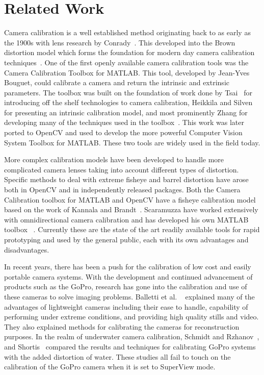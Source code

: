 \section{Related Work}\label{sec:camrel}
Camera calibration is a well established method originating back to as early as the 1900s with lens research by Conrady~\cite{Conrady1919}. This developed into the Brown distortion model which forms the foundation for modern day camera calibration techniques~\cite{Brown1966,Brown1971,Brown1986}. One of the first openly available camera calibration tools was the Camera Calibration Toolbox for MATLAB. This tool, developed by Jean-Yves Bouguet, could calibrate a camera and return the intrinsic and extrinsic parameters. The toolbox was built on the foundation of work done by Tsai~\cite{Tsai1987} for introducing off the shelf technologies to camera calibration, Heikkila and Silven~\cite{Silven1997} for presenting an intrinsic calibration model, and most prominently Zhang for developing many of the techniques used in the toolbox~\cite{Zhang2000}. This work was later ported to OpenCV and used to develop the more powerful Computer Vision System Toolbox for MATLAB. These two tools are widely used in the field today. 

More complex calibration models have been developed to handle more complicated camera lenses taking into account different types of distortion. Specific methods to deal with extreme fisheye and barrel distortion have arose both in OpenCV and in independently released packages. Both the  Camera Calibration toolbox for MATLAB and OpenCV have a fisheye calibration model based on the work of Kannala and Brandt~\cite{Bradnt2006}. Scaramuzza have worked extensively with omnidirectional camera calibration and has developed his own MATLAB toolbox ~\cite{Scara2006_1,Scara2006_2,Scara2008_1,Scara2008_2}. Currently these are the state of the art readily available tools for rapid prototyping and used by the general public, each with its own advantages and disadvantages.

In recent years, there has been a push for the calibration of low cost and easily portable camera systems. With the development and continued advancement of products such as the GoPro, research has gone into the calibration and use of these cameras to solve imaging problems. Balletti et al. ~\cite{balletti2014calibration} explained many of the advantages of lightweight cameras including their ease to handle, capability of performing under extreme conditions, and providing high quality stills and video. They also explained methods for calibrating the cameras for reconstruction purposes. In the realm of underwater camera calibration, Schmidt and Rzhanov~\cite{schmidt2012measurement}, and Shortis~\cite{shortis2015calibration} compared the results and techniques for calibrating GoPro systems with the added distortion of water. These studies all fail to touch on the calibration of the GoPro camera when it is set to SuperView mode. 

